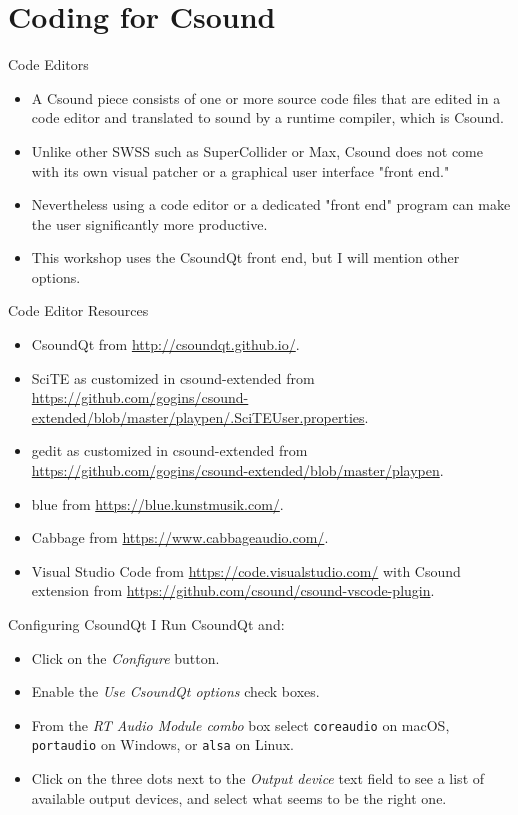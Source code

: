\documentclass{beamer}
\begin{document}
    \section{Coding for Csound}
    \begin{frame}{Code Editors}
        \begin{itemize}
            \item A Csound piece consists of one or more source code files that are
            edited in a code editor and translated to sound by a runtime compiler, which is
            Csound.
            \item Unlike other SWSS such as SuperCollider or Max, Csound does not
            come with its own visual patcher or a graphical user interface "front end."
            \item Nevertheless using a code editor or a dedicated "front end"
            program can make the user significantly more productive.
            \item This workshop uses the CsoundQt front end, but I will mention
            other options.
        \end{itemize}
    \end{frame}
    \begin{frame}{Code Editor Resources}
        \begin{itemize}
            \item CsoundQt from \url{http://csoundqt.github.io/}.
            \item SciTE as customized in csound-extended from
            \url{https://github.com/gogins/csound-extended/blob/master/playpen/.SciTEUser.properties}.
            \item gedit as customized in csound-extended from
\url{https://github.com/gogins/csound-extended/blob/master/playpen}.
            \item blue from \url{https://blue.kunstmusik.com/}.
            \item Cabbage from \url{https://www.cabbageaudio.com/}.
            \item Visual Studio Code from \url{https://code.visualstudio.com/} with
            Csound extension from \url{https://github.com/csound/csound-vscode-plugin}.
        \end{itemize}
    \end{frame}
    \begin{frame}{Configuring CsoundQt I}
        Run CsoundQt and:
        \begin{itemize}
            \item Click on the \textit{Configure} button. 
            \item Enable the \textit{Use CsoundQt options} check boxes.
            \item From the \textit{RT Audio Module combo} box select
            \texttt{coreaudio} on macOS, \texttt{portaudio} on Windows, or \texttt{alsa} on
            Linux.
            \item Click on the three dots next to the \textit{Output device} text
            field to see a list of available output devices, and select what seems to be the
            right one.
        \end{itemize}
    \end{frame}
\end{document}
